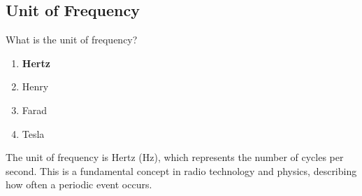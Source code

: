 \subsection{Unit of Frequency}
\label{T5A06}

\begin{tcolorbox}[colback=gray!10!white,colframe=black!75!black,title=T5A06]
What is the unit of frequency?
\begin{enumerate}[noitemsep]
    \item \textbf{Hertz}
    \item Henry
    \item Farad
    \item Tesla
\end{enumerate}
\end{tcolorbox}

The unit of frequency is Hertz (Hz), which represents the number of cycles per second. This is a fundamental concept in radio technology and physics, describing how often a periodic event occurs.